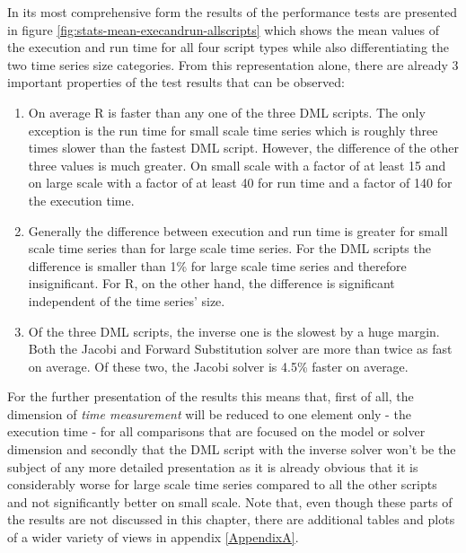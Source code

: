 In its most comprehensive form the results of the performance tests are presented in figure \ref{fig:stats-mean-execandrun-allscripts} which shows the mean values of the execution and run time for all four script types while also differentiating the two time series size categories. From this representation alone, there are already 3 important properties of the test results that can be observed:

\begin{enumerate}
    \item On average R is faster than any one of the three DML scripts. The only exception is the run time for small scale time series which is roughly three times slower than the fastest DML script. However, the difference of the other three values is much greater. On small scale with a factor of at least 15 and on large scale with a factor of at least 40 for run time and a factor of 140 for the execution time.
    \item Generally the difference between execution and run time is greater for small scale time series than for large scale time series. For the DML scripts the difference is smaller than 1\% for large scale time series and therefore insignificant. For R, on the other hand, the difference is significant independent of the time series’ size.
    \item Of the three DML scripts, the inverse one is the slowest by a huge margin. Both the Jacobi and Forward Substitution solver are more than twice as fast on average. Of these two, the Jacobi solver is 4.5\% faster on average.
\end{enumerate}

For the further presentation of the results this means that, first of all, the dimension of \textit{time measurement} will be reduced to one element only - the execution time - for all comparisons that are focused on the model or solver dimension and secondly that the DML script with the inverse solver won't be the subject of any more detailed presentation as it is already obvious that it is considerably worse for large scale time series compared to all the other scripts and not significantly better on small scale. Note that, even though these parts of the results are not discussed in this chapter, there are additional tables and plots of a wider variety of views in appendix \ref{AppendixA}.

